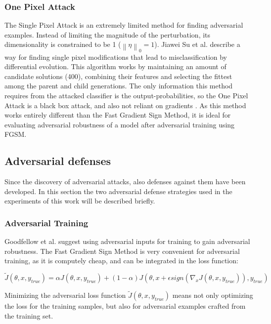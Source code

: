 \documentclass[draft,final]{vutinfth} %
\newcommand{\norm}[1]{\left\lVert#1\right\rVert}
\begin{document}
\subsubsection{One Pixel Attack}

The Single Pixel Attack is an extremely limited method for finding adversarial examples.
Instead of limiting the magnitude of the perturbation, its dimensionality is constrained to be 1 ($\norm{\eta}_0=1$).
Jiawei Su et al. describe a way for finding single pixel modifications that lead to misclassification by differential evolution.
This algorithm works by maintaining an amount of candidate solutions (400), combining their features and selecting the fittest among the parent and child generations.
The only information this method requires from the attacked classifier is the output-probabilities, so the One Pixel Attack is a black box attack, and also not reliant on gradients \cite{Jiawei2017}.
As this method works entirely different than the Fast Gradient Sign Method, it is ideal for evaluating adversarial robustness of a model after adversarial training using FGSM.

\subsection{Adversarial defenses}

Since the discovery of adversarial attacks, also defenses against them have been developed.
In this section the two adversarial defense strategies used in the experiments of this work will be described briefly.

\subsubsection{Adversarial Training}

Goodfellow et al. suggest using adversarial inputs for training to gain adversarial robustness.
The Fast Gradient Sign Method is very convenient for adversarial training, as it is computely cheap, and can be integrated in the loss function:

\begin{equation}
	\tilde{J}(\theta, x, y_{true}) = \alpha J(\theta, x, y_{true}) + (1-\alpha)J(\theta, x + \epsilon sign(\nabla_xJ(\theta, x, y_{true})), y_{true})
\end{equation}

Minimizing the adversarial loss function $\tilde{J}(\theta, x, y_{true})$ means not only optimizing the loss for the training samples, but also for adversarial examples crafted from the training set.
\cite{Goodfellow2015}
\end{document}
